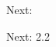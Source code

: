 \documentclass[12pt]{article} %
\begin{document}
%
%
%







\hrulefill

\medskip

Next: 


\hrulefill

Next: 2.2 
\end{document}
